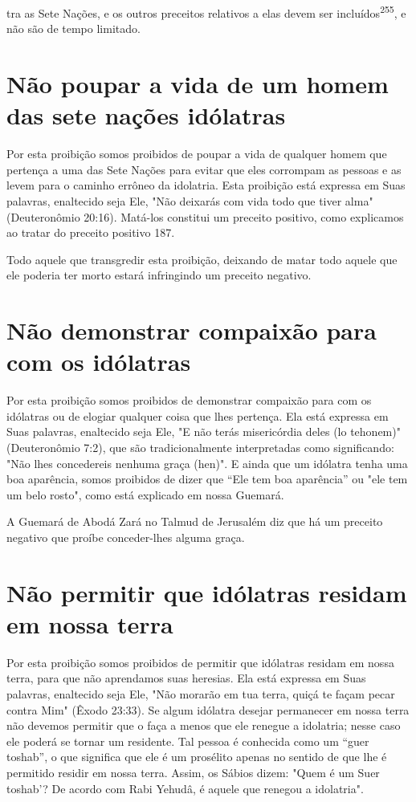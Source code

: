 tra as Sete Nações, e os outros preceitos relativos a elas devem ser
incluídos\textsuperscript{255}, e não são de tempo limitado.

\section{Não poupar a vida de um homem das sete nações idólatras}

Por esta proibição somos proibidos de poupar a vida de qualquer homem
que pertença a uma das Sete Nações para evitar que eles corrompam as
pessoas e as levem para o caminho errôneo da idolatria. Esta proibição
está expressa em Suas palavras, enaltecido seja Ele, "Não deixarás com
vida todo que tiver alma" (Deuteronômio 20:16). Matá-los constitui um
preceito positi­vo, como explicamos ao tratar do preceito positivo 187.

Todo aquele que transgredir esta proibição, deixando de matar to­do
aquele que ele poderia ter morto estará infringindo um preceito
negativo.

\section{Não demonstrar compaixão para com os idólatras}

Por esta proibição somos proibidos de demonstrar compaixão para com os
idólatras ou de elogiar qualquer coisa que lhes pertença. Ela está
ex­pressa em Suas palavras, enaltecido seja Ele, "E não terás
misericórdia deles (lo tehonem)" (Deuteronômio 7:2), que são
tradicionalmente interpretadas co­mo significando: "Não lhes concedereis
nenhuma graça (hen)". E ainda que um idólatra tenha uma boa aparência,
somos proibidos de dizer que ``Ele tem boa aparência'' ou "ele tem um belo
rosto", como está explicado em nossa Guemará.

A Guemará de Abodá Zará no Talmud de Jerusalém diz que há um preceito
negativo que proíbe conceder-lhes alguma graça.

\section{Não permitir que idólatras residam em nossa terra}

Por esta proibição somos proibidos de permitir que idólatras resi­dam em
nossa terra, para que não aprendamos suas heresias. Ela está expressa em
Suas palavras, enaltecido seja Ele, "Não morarão em tua terra, quiçá te
fa­çam pecar contra Mim" (Êxodo 23:33). Se algum idólatra desejar
permanecer em nossa terra não devemos permitir que o faça a menos que
ele renegue a idolatria; nesse caso ele poderá se tornar um residente.
Tal pessoa é conhecida como um ``guer toshab'', o que significa que ele é
um prosélito apenas no sen­tido de que lhe é permitido residir em nossa
terra. Assim, os Sábios dizem: "Quem é um Suer toshab'? De acordo com
Rabi Yehudâ, é aquele que rene­gou a idolatria".

